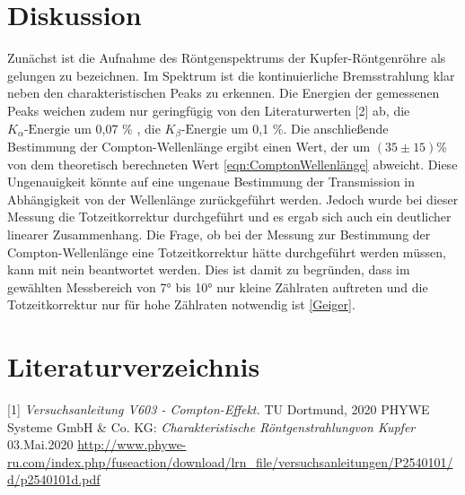 \documentclass[titlepage = firstcover]{scrartcl}
\begin{document}
    \section{Diskussion}
        Zunächst ist die Aufnahme des Röntgenspektrums der Kupfer-Röntgenröhre als gelungen zu bezeichnen. Im Spektrum ist die kontinuierliche Bremsstrahlung 
        klar neben den charakteristischen Peaks zu erkennen. Die Energien der gemessenen Peaks weichen zudem nur geringfügig von den Literaturwerten [2] ab, 
        die $K_{\alpha}\text{-Energie}$ um 0,07 \% , die $K_{\beta}\text{-Energie}$ um 0,1 \%. Die anschließende Bestimmung der Compton-Wellenlänge ergibt
        einen Wert, der um $(35 \pm 15)$\% von dem theoretisch berechneten Wert \ref{eqn:ComptonWellenlänge} abweicht. Diese Ungenauigkeit könnte auf eine
        ungenaue Bestimmung der Transmission in Abhängigkeit von der Wellenlänge zurückgeführt werden. Jedoch wurde bei dieser Messung die Totzeitkorrektur
        durchgeführt und es ergab sich auch ein deutlicher linearer Zusammenhang. Die Frage, ob bei der Messung zur Bestimmung der Compton-Wellenlänge eine
        Totzeitkorrektur hätte durchgeführt werden müssen, kann mit nein beantwortet werden. Dies ist damit zu begründen, dass im gewählten Messbereich von 
        7° bis 10° nur kleine Zählraten auftreten und die Totzeitkorrektur nur für hohe Zählraten notwendig ist \ref{Geiger}.


    \newpage
    \section{Literaturverzeichnis}
            [1] \textit{Versuchsanleitung V603 - Compton-Effekt.} TU Dortmund, 2020 \newline
            [2] PHYWE Systeme GmbH \& Co. KG: \textit{Charakteristische Röntgenstrahlungvon Kupfer} 03.Mai.2020
                \url{http://www.phywe-ru.com/index.php/fuseaction/download/lrn_file/versuchsanleitungen/P2540101/d/p2540101d.pdf}

    \newpage
    
\end{document}

